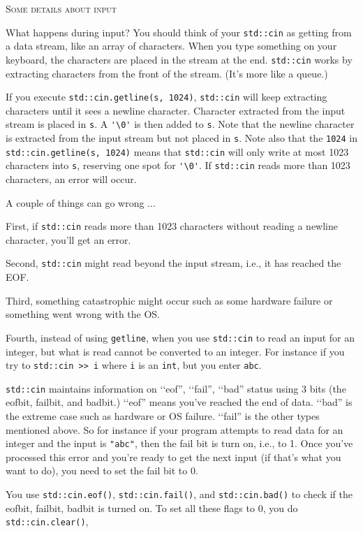 \textsc{Some details about input}

What happens during input?
You should think of your \verb!std::cin! as
getting from a data stream, like an array of characters.
When you type something on your keyboard, the characters
are placed in the stream at the end.
\verb!std::cin! works by extracting characters
from the front of the stream.
(It's more like a queue.)

If you execute
\verb!std::cin.getline(s, 1024)!,
\verb!std::cin! will keep extracting
characters until it sees a newline character.
Character extracted from the input stream is 
placed in \verb!s!.
A \verb!'\0'! is then added to \verb!s!.
Note that the newline character is extracted from the
input stream but not placed in \verb!s!.
Note also that the \verb!1024! in
\verb!std::cin.getline(s, 1024)!
means that
\verb!std::cin!
will only write
at most 1023 characters into \verb!s!, reserving
one spot for \verb!'\0'!.
If \verb!std::cin! reads more than 1023 characters,
an error will occur.

A couple of things can go wrong ...

First, if
\verb!std::cin! reads more than 1023 characters without reading
a newline character, you'll get an error.

Second,
\verb!std::cin!
might read beyond the input stream, i.e.,
it has reached the
EOF.

Third,
something catastrophic might occur such as some
hardware failure or something went wrong with the OS.

Fourth, instead of using \verb!getline!,
when you use
\verb!std::cin! to read an input
for an integer,
but
what is read cannot be converted to an integer.
For instance if you try to \verb!std::cin >> i! where
\verb!i! is an \verb!int!, but you enter \verb!abc!.

\verb!std::cin! maintains information on
\lq\lq eof'', \lq\lq fail'', \lq\lq bad'' status
using 3 bits
(the eofbit, failbit, and badbit.)
\lq\lq eof'' means you've reached the end of data.
\lq\lq bad'' is the extreme case such as hardware or OS failure.
\lq\lq fail'' is the other types mentioned above.
So for instance if your program attempts to read data for an integer and
the input is \verb!"abc"!,
then the fail bit is turn on, i.e., to 1.
Once you've processed this error and you're ready to
get the next input (if that's what you want to do),
you need to set the fail bit to 0.

You use
\verb!std::cin.eof()!,
\verb!std::cin.fail()!, and
\verb!std::cin.bad()!
to check if the eofbit, failbit, badbit is turned on.
To set all these flags to 0, you do
\verb!std::cin.clear()!,

